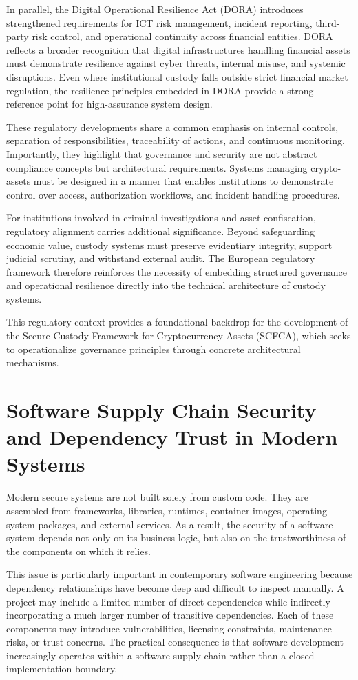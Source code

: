 \documentclass[12pt,a4paper]{report}
\begin{document}
In parallel, the Digital Operational Resilience Act (DORA) \cite{DORA2022} introduces strengthened requirements for ICT risk management, incident reporting, third-party risk control, and operational continuity across financial entities. DORA reflects a broader recognition that digital infrastructures handling financial assets must demonstrate resilience against cyber threats, internal misuse, and systemic disruptions. Even where institutional custody falls outside strict financial market regulation, the resilience principles embedded in DORA provide a strong reference point for high-assurance system design.

These regulatory developments share a common emphasis on internal controls, separation of responsibilities, traceability of actions, and continuous monitoring. Importantly, they highlight that governance and security are not abstract compliance concepts but architectural requirements. Systems managing crypto-assets must be designed in a manner that enables institutions to demonstrate control over access, authorization workflows, and incident handling procedures.

For institutions involved in criminal investigations and asset confiscation, regulatory alignment carries additional significance. Beyond safeguarding economic value, custody systems must preserve evidentiary integrity, support judicial scrutiny, and withstand external audit. The European regulatory framework therefore reinforces the necessity of embedding structured governance and operational resilience directly into the technical architecture of custody systems.

This regulatory context provides a foundational backdrop for the development of the Secure Custody Framework for Cryptocurrency Assets (SCFCA), which seeks to operationalize governance principles through concrete architectural mechanisms.

\section{Software Supply Chain Security and Dependency Trust in Modern Systems}
Modern secure systems are not built solely from custom code. They are assembled from frameworks, libraries, runtimes, container images, operating system packages, and external services. As a result, the security of a software system depends not only on its business logic, but also on the trustworthiness of the components on which it relies.

This issue is particularly important in contemporary software engineering because dependency relationships have become deep and difficult to inspect manually. A project may include a limited number of direct dependencies while indirectly incorporating a much larger number of transitive dependencies. Each of these components may introduce vulnerabilities, licensing constraints, maintenance risks, or trust concerns. The practical consequence is that software development increasingly operates within a software supply chain rather than a closed implementation boundary.
\end{document}

